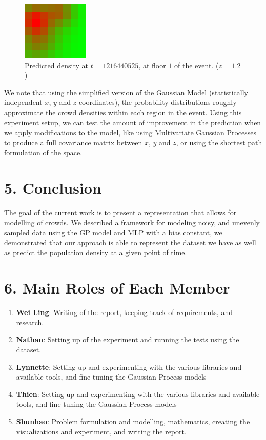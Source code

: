 \documentclass[letterpaper]{article}
\begin{document}
\begin{figure}[h!]
  \centering
    \includegraphics[width=120px,natwidth=320,natheight=280]{selected_renders/1_1216440525p.png}
  \caption{Predicted density at $t=1216440525$, at floor $1$ of the event. ($z = 1.2$)}
  \label{fig:t4dist}
\end{figure}

We note that using the simplified version of the Gaussian Model (statistically independent $x$, $y$ and $z$ coordinates), the probability distributions roughly approximate the crowd densities within each region in the event. Using this experiment setup, we can test the amount of improvement in the prediction when we apply modifications to the model, like using Multivariate Gaussian Processes to produce a full covariance matrix between $x$, $y$ and $z$, or using the shortest path formulation of the space.

\section{5.  Conclusion}

The goal of the current work is to present a representation that allows for modelling of crowds. We described a framework for modeling noisy, and unevenly sampled
data using the GP model and MLP with a bias constant, we demonstrated that our approach is able to represent the dataset we have as well as predict the population density at a given point of time.

\section{6. Main Roles of Each Member}
\begin{enumerate}
\item \textbf{Wei Ling}: 
Writing of the report, keeping track of requirements, and research.
\item \textbf{Nathan}: 
Setting up of the experiment and running the tests using the dataset.
\item \textbf{Lynnette}: 
Setting up and experimenting with the various libraries and available tools, and fine-tuning the Gaussian Process models
\item \textbf{Thien}: 
Setting up and experimenting with the various libraries and available tools, and fine-tuning the Gaussian Process models
\item \textbf{Shunhao}: 
Problem formulation and modelling, mathematics, creating the visualizations and experiment, and writing the report.
\end{enumerate}
\end{document}
